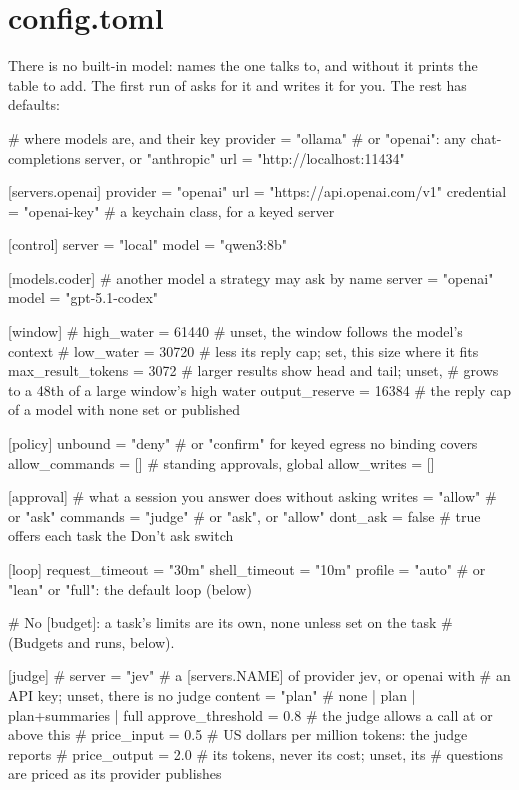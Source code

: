 \section{config.toml}

There is no built-in model: \code{[control]} names the one \nodwyn{} talks
to, and without it \nodwyn{} prints the table to add. The first run of
 asks for it and writes it for you. The rest has defaults:

\begin{txt}
                     # where models are, and their key
provider = "ollama"                 # or "openai": any chat-completions server, or "anthropic"
url      = "http://localhost:11434"

[servers.openai]
provider   = "openai"
url        = "https://api.openai.com/v1"
credential = "openai-key"           # a keychain class, for a keyed server

[control]
server = "local"
model  = "qwen3:8b"

[models.coder]                      # another model a strategy may ask by name
server = "openai"
model  = "gpt-5.1-codex"

[window]
# high_water      = 61440   # unset, the window follows the model's context
# low_water       = 30720   #   less its reply cap; set, this size where it fits
max_result_tokens = 3072    # larger results show head and tail; unset,
                            #   grows to a 48th of a large window's high water
output_reserve    = 16384   # the reply cap of a model with none set or published

[policy]
unbound        = "deny"     # or "confirm" for keyed egress no binding covers
allow_commands = []         # standing approvals, global
allow_writes   = []

[approval]                  # what a session you answer does without asking
writes   = "allow"          # or "ask"
commands = "judge"          # or "ask", or "allow"
dont_ask = false            # true offers each task the Don't ask switch

[loop]
request_timeout = "30m"
shell_timeout   = "10m"
profile         = "auto"    # or "lean" or "full": the default loop (below)

# No [budget]: a task's limits are its own, none unless set on the task
# (Budgets and runs, below).

[judge]
# server = "jev"            # a [servers.NAME] of provider jev, or openai with
                            #   an API key; unset, there is no judge
content = "plan"            # none | plan | plan+summaries | full
approve_threshold = 0.8     # the judge allows a call at or above this
# price_input   = 0.5       # US dollars per million tokens: the judge reports
# price_output  = 2.0       #   its tokens, never its cost; unset, its
                            #   questions are priced as its provider publishes


\end{txt}
